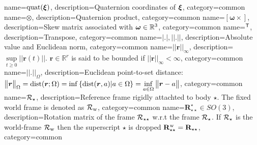 {
	name={\ensuremath{\quat(\FB)}},
	description={Quaternion coordinates of $\boldsymbol{\xi}$},
	category={common} 
}
{
	name={\ensuremath{\otimes}},
	description={Quaternion product},
	category={common} 
}
{
	name={\ensuremath{\left[\boldsymbol{\omega}\times\right]}},%
	description={Skew matrix associated with $\boldsymbol{\omega}\in \mathbb{R}^3$},
	category={common} 
}
{
	name={\ensuremath{{\tp}}},%
	description={Transpose},
	category={common}  
}
{
	name={$|.|, ||.||$},%
	description={Absolute value and Euclidean norm},
	category={common}  
} 
{
	name={\ensuremath{||{\bm{r}}||_\infty}},%
	description={$\underset{t\geq0}{\sup}||{\bm{r}(t)}||$. $\bm{r}\in\mathbb{R}^{r}$ is said to be bounded if $||{\bm{r}}||_\infty<\infty$},
	category={common}  
}
{
	name={\ensuremath{||{.}||_\Omega}},
	description={Euclidean point-to-set distance: $\begin{Vmatrix} \bm{r} \end{Vmatrix}_\Omega={\rm{dist}}(\bm{r};\Omega)=\inf\left\{{\mathrm{dist}}(\bm{r},a)|a\in\Omega\right\}=\underset{a \in\Omega}{\inf}\begin{Vmatrix} \bm{r} - a \end{Vmatrix}$},
	category={common}  
}
{
	name={\ensuremath{\setR_{\star}}},
	description={Reference frame rigidly attachted to body $\star$. The fixed world frame is denoted as ${\cal R}_{\rm w}$},
	category={common}  
}
{
	name={\ensuremath{\mathbf{R}_{\star\star}^{\star}\in SO(3)}},
	description={Rotation matrix of the frame ${\cal R}_{\star\star}$ w.r.t the frame ${\cal R}_{\star}$. If ${\cal R}_{\star}$ is the world-frame ${\cal R}_{\rm w}$ then the superscript $\star$ is dropped $\mathbf{R}_{\star\star}^{\rm w} = \mathbf{R}_{\star\star}$},
	category={common}  
}